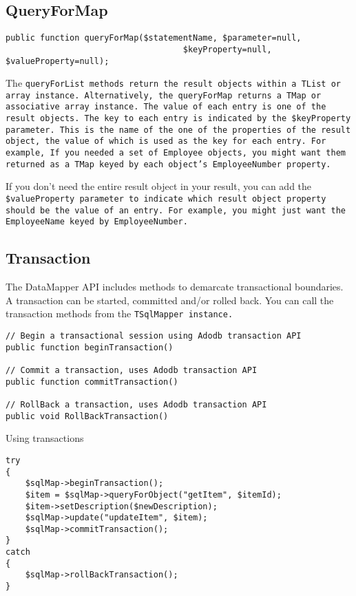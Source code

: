 \subsection{QueryForMap}
\begin{verbatim}
public function queryForMap($statementName, $parameter=null,
                                    $keyProperty=null, $valueProperty=null);
\end{verbatim}
The \tt{queryForList} methods return the result objects within a \tt{TList} or
array instance. Alternatively, the \tt{queryForMap} returns a TMap or
associative array instance. The value of each entry is one of the result
objects. The key to each entry is indicated by the \tt{\$keyProperty}
parameter. This is the name of the one of the properties of the result object,
the value of which is used as the key for each entry. For example, If you
needed a set of \tt{Employee} objects, you might want them returned as a
\tt{TMap} keyed by each object's \tt{EmployeeNumber} property.

If you don't need the entire result object in your result, you can add the
\tt{\$valueProperty} parameter to indicate which result object property should
be the value of an entry. For example, you might just want the
\tt{EmployeeName} keyed by \tt{EmployeeNumber}.

\subsection{Transaction}
The DataMapper API includes methods to demarcate transactional boundaries. A
transaction can be started, committed and/or rolled back. You can call the
transaction methods from the \tt{TSqlMapper} instance.

\begin{verbatim}
// Begin a transactional session using Adodb transaction API
public function beginTransaction()

// Commit a transaction, uses Adodb transaction API
public function commitTransaction()

// RollBack a transaction, uses Adodb transaction API
public void RollBackTransaction()
\end{verbatim}

\begin{example}\label{example:9.15}
Using transactions
\begin{verbatim}
try
{
    $sqlMap->beginTransaction();
    $item = $sqlMap->queryForObject("getItem", $itemId);
    $item->setDescription($newDescription);
    $sqlMap->update("updateItem", $item);
    $sqlMap->commitTransaction();
}
catch
{
    $sqlMap->rollBackTransaction();
}
\end{verbatim}
\end{example}

